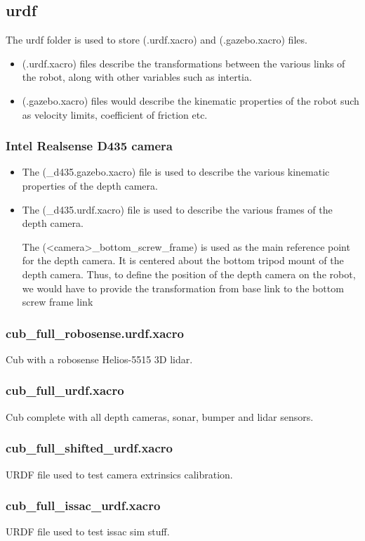 \documentclass[11pt]{article}
\begin{document}
\subsection{urdf}
The urdf folder is used to store (.urdf.xacro) and (.gazebo.xacro) files.
\begin{itemize}
 \item {
       (.urdf.xacro) files describe the transformations between the various links of the robot, along with other variables such as intertia.
       }
 \item{
       (.gazebo.xacro) files would describe the kinematic properties of the robot such as velocity limits, coefficient of friction etc.
       }
\end{itemize}
\subsubsection{Intel Realsense D435 camera}
\begin{itemize}
 \item {
       The (\_d435.gazebo.xacro) file is used to describe the various kinematic properties of the depth camera.
       }
 \item{
       The (\_d435.urdf.xacro) file is used to describe the various frames of the depth camera.

       The (<camera>\_bottom\_screw\_frame) is used as the main reference point for the depth camera. It is centered about the bottom tripod mount of the depth camera.
       Thus, to define the position of the depth camera on the robot, we would have to provide the transformation from base link to the bottom screw frame link
       }
\end{itemize}
\subsubsection{cub\_full\_robosense.urdf.xacro}
Cub with a robosense Helios-5515 3D lidar.
\subsubsection{cub\_full\_urdf.xacro}
Cub complete with all depth cameras, sonar, bumper and lidar sensors.
\subsubsection{cub\_full\_shifted\_urdf.xacro}
URDF file used to test camera extrinsics calibration.
\subsubsection{cub\_full\_issac\_urdf.xacro}
URDF file used to test issac sim stuff.
\end{document}

